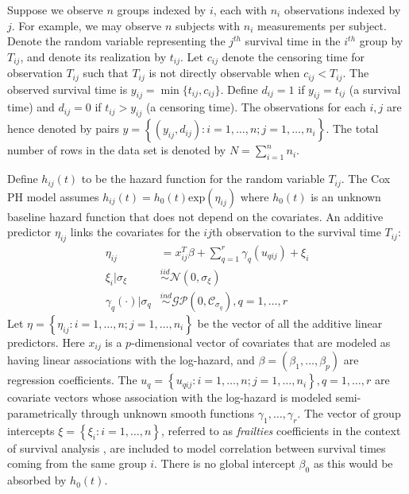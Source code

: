 \documentclass[ba]{imsart}
\begin{document}
Suppose we observe $n$ groups indexed by $i$, each with $n_{i}$ observations indexed by $j$. For example, we may observe $n$ subjects with $n_{i}$ measurements per subject. Denote the random variable representing the $j^{th}$ survival time in the $i^{th}$ group by $T_{ij}$, and denote its realization by $t_{ij}$. Let $c_{ij}$ denote the censoring time for observation $T_{ij}$ such that $T_{ij}$ is not directly observable when $c_{ij} < T_{ij}$. The observed survival time is $y_{ij} = \min\{t_{ij},c_{ij}\}$. Define $d_{ij} = 1$ if $y_{ij} = t_{ij}$ (a survival time) and $d_{ij} = 0$ if $t_{ij} > y_{ij}$ (a censoring time). The observations for each $i,j$ are hence denoted by pairs $y =  \left\{(y_{ij},d_{ij}): i = 1,\ldots,n; j = 1,\ldots,n_{i} \right\}$. The total number of rows in the data set is denoted by $N = \sum_{i=1}^{n}n_{i}$.

Define $h_{ij}(t)$ to be the hazard function for the random variable $T_{ij}$. The Cox PH model assumes $h_{ij}(t) = h_0(t)\text{exp}(\eta_{ij})$ where $h_0(t)$ is an unknown baseline hazard function that does not depend on the covariates. An additive predictor $\eta_{ij}$ links the covariates for the $ij$th observation to the survival time $T_{ij}$:
\begin{equation}\begin{aligned}\label{eqn:eta}
\eta_{ij} &=x_{ij}^{T}\beta+\sum_{q=1}^{r} \gamma_q(u_{qij}) +\xi_{i} \\
\xi_i | \sigma_{\xi} &\overset{iid}{\sim} \mathcal{N}(0,\sigma_{\xi}) \\
\gamma_{q}(\cdot)|\sigma_{q} &\overset{ind}{\sim} \mathcal{GP}\left(0,\mathcal{C}_{\sigma_q}\right), q = 1,\ldots,r
\end{aligned}\end{equation}
Let $\eta = \left\{ \eta_{ij}: i = 1,\ldots,n; j = 1,\ldots,n_{i}\right\}$ be the vector of all the additive linear predictors. Here $x_{ij}$ is a $p$-dimensional vector of covariates that are modeled as having linear associations with the log-hazard, and $\beta = (\beta_{1},\ldots,\beta_{p})$ are regression coefficients. The $u_{q} = \left\{u_{qij}: i = 1,\ldots,n; j = 1,\ldots,n_{i} \right\}, q = 1,\ldots,r$ are covariate vectors whose association with the log-hazard is modeled semi-parametrically through unknown smooth functions $\gamma_1,\ldots,\gamma_r$. The vector of group intercepts $\xi = \left\{ \xi_{i}: i=1,\ldots,n\right\}$, referred to as \textit{frailties} coefficients in the context of survival analysis \citep{frailty}, are included to model correlation between survival times coming from the same group $i$. There is no global intercept $\beta_{0}$ as this would be absorbed by $h_{0}(t)$.
\end{document}
